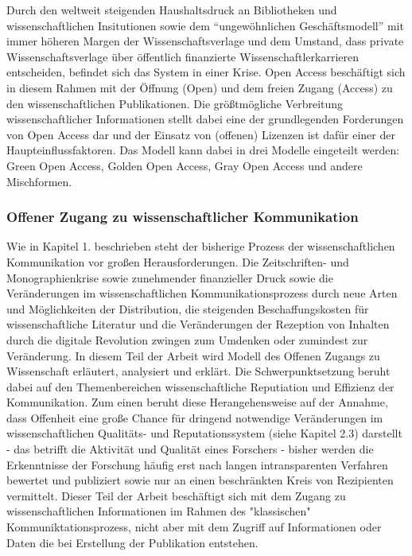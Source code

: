 Durch den weltweit steigenden Haushaltsdruck an Bibliotheken und wissenschaftlichen Insitutionen sowie dem “ungewöhnlichen Geschäftsmodell”\cite{cite:12} mit immer höheren Margen der Wissenschaftsverlage und dem Umstand, dass private Wissenschaftsverlage über öffentlich finanzierte Wissenschaftlerkarrieren entscheiden\cite{cite:13}, befindet sich das System in einer Krise\cite{cite:14}. Open Access beschäftigt sich in diesem Rahmen mit der Öffnung (Open) und dem freien Zugang (Access) zu den wissenschaftlichen Publikationen. Die größtmögliche Verbreitung wissenschaftlicher Informationen stellt dabei eine der grundlegenden Forderungen von Open Access dar\cite{cite:15} und der Einsatz von (offenen) Lizenzen ist dafür einer der Haupteinflussfaktoren\cite{cite:16}. Das Modell kann dabei in drei Modelle eingeteilt werden: Green Open Access, Golden Open Access, Gray Open Access und andere Mischformen.
\subsubsection{Offener Zugang zu wissenschaftlicher Kommunikation}
Wie in Kapitel 1. beschrieben steht der bisherige Prozess der wissenschaftlichen Kommunikation vor großen Herausforderungen. Die Zeitschriften- und Monographienkrise sowie zunehmender finanzieller Druck sowie die Veränderungen im wissenschaftlichen Kommunikationsprozess durch neue Arten und Möglichkeiten der Distribution, die steigenden Beschaffungskosten für wissenschaftliche Literatur\cite{cite:17} und die Veränderungen der Rezeption von Inhalten durch die digitale Revolution zwingen zum Umdenken oder zumindest zur Veränderung. In diesem Teil der Arbeit wird Modell des Offenen Zugangs zu Wissenschaft erläutert, analysiert und erklärt.
Die Schwerpunktsetzung beruht dabei auf den Themenbereichen wissenschaftliche Reputiation und Effizienz der Kommunikation. Zum einen beruht diese Herangehensweise auf der Annahme, dass Offenheit eine große Chance für dringend notwendige Veränderungen im wissenschaftlichen Qualitäts- und Reputationssystem (siehe Kapitel 2.3) darstellt - das betrifft die Aktivität und Qualität eines Forschers - bisher werden die Erkenntnisse der Forschung häufig erst nach langen intransparenten Verfahren bewertet und publiziert sowie nur an einen beschränkten Kreis von Rezipienten vermittelt. Dieser Teil der Arbeit beschäftigt sich mit dem Zugang zu wissenschaftlichen Informationen im Rahmen des "klassischen" Kommuniktationsprozess, nicht aber mit dem Zugriff auf Informationen oder Daten die bei Erstellung der Publikation entstehen.
